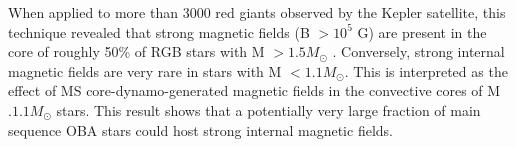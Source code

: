 When applied to more than 3000 red giants observed by the Kepler satellite, this technique revealed that
strong magnetic fields (B $> 10^5$ G) are present in the core of roughly 50\% of RGB stars with M $> 1.5M_\odot$ \citep{Stello_2016} .
Conversely, strong internal magnetic fields are very rare in stars with M $< 1.1M_\odot$. This is interpreted as the
effect of MS core-dynamo-generated magnetic fields in the convective cores of M $. 1.1M_\odot$ stars.
This result shows that a potentially very large fraction of main sequence OBA stars could host strong internal magnetic fields.



